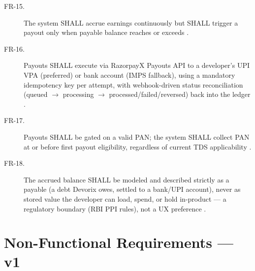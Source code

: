 \begin{description}
\item[FR-15.] The system SHALL accrue earnings continuously but SHALL trigger a payout only when payable balance reaches or exceeds  \cite{masterplan_2026,mvpspec_2026}.
\item[FR-16.] Payouts SHALL execute via RazorpayX Payouts API to a developer's UPI VPA (preferred) or bank account (IMPS fallback), using a mandatory idempotency key per attempt, with webhook-driven status reconciliation (queued $\to$ processing $\to$ processed/failed/reversed) back into the ledger \cite{masterplan_2026,mvpspec_2026}.
\item[FR-17.] Payouts SHALL be gated on a valid PAN; the system SHALL collect PAN at or before first payout eligibility, regardless of current TDS applicability \cite{masterplan_2026,mvpspec_2026}.
\item[FR-18.] The accrued balance SHALL be modeled and described strictly as a payable (a debt Devorix owes, settled to a bank/UPI account), never as stored value the developer can load, spend, or hold in-product --- a regulatory boundary (RBI PPI rules), not a UX preference \cite{masterplan_2026}.
\end{description}

\section{Non-Functional Requirements --- v1}
\label{sec:nonfunctional-requirements}

